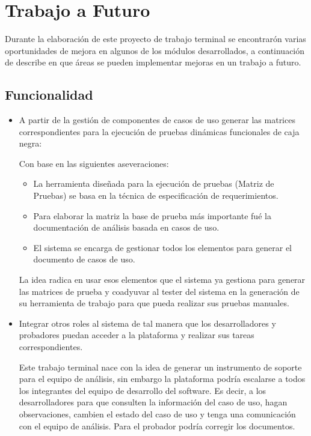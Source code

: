 \chapter{Trabajo a Futuro} \label{cap:doce}
Durante la elaboración de este proyecto de trabajo terminal se encontrarón varias oportunidades de mejora en algunos de los módulos desarrollados, a continuación de describe en que áreas se pueden implementar mejoras en un trabajo a futuro.

\section{Funcionalidad}
\begin{itemize}
	\item A partir de la gestión de componentes de casos de uso generar las matrices correspondientes para la ejecución de pruebas dinámicas funcionales de caja negra:
	
	Con base en las siguientes aseveraciones:
	\begin{itemize}
	\item La herramienta diseñada para la ejecución de pruebas (Matriz de Pruebas) se basa en la  técnica de especificación de requerimientos.
	\item Para elaborar la matriz la base de prueba más importante fué la documentación de análisis basada en casos de uso.
	\item El sistema se encarga de gestionar todos los elementos para generar el documento de casos de uso.
	\end{itemize}

	La idea radica en usar esos elementos que el sistema ya gestiona para generar las matrices de prueba y coadyuvar al tester del sistema en la generación  de su herramienta de trabajo para que pueda realizar sus pruebas manuales.
	
	\item Integrar otros roles al sistema de tal manera que los desarrolladores y probadores puedan acceder a la plataforma y realizar sus tareas correspondientes.
	
	Este trabajo terminal nace con la idea de generar un instrumento de soporte para el equipo de análisis, sin embargo la plataforma podría escalarse a todos los integrantes del equipo de desarrollo del software. Es decir, a los desarrolladores para que consulten la información del caso de uso, hagan observaciones, cambien el estado del caso de uso y tenga una comunicación con el equipo de análisis. Para el probador podría corregir los documentos.
	
\end{itemize}
 
